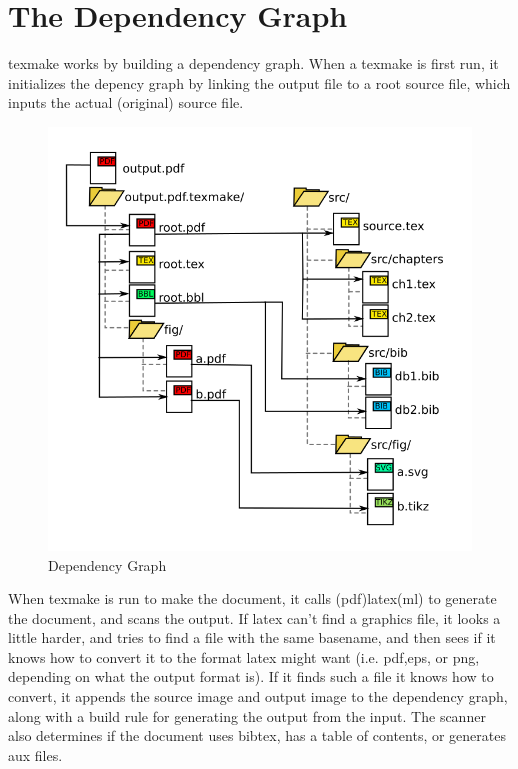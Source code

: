 \section{The Dependency Graph}

texmake works by building a dependency graph. 
%
When a texmake is first run, it initializes the depency graph by linking the output file to a root source file, which inputs the actual (original) source file.

\begin{figure}[H]
    \centering
    \includegraphics{fig/dependencies}
    \caption{Dependency Graph}
\end{figure}

When texmake is run to make the document, it calls (pdf)latex(ml) to generate the document, and scans the output.
%
If latex can't find a graphics file, it looks a little harder, and tries to find a file with the same basename, and then sees if it knows how to convert it to the format latex might want (i.e. pdf,eps, or png, depending on what the output format is). 
%
If it finds such a file it knows how to convert, it appends the source image and output image to the dependency graph, along with a build rule for generating the output from the input. 
%
The scanner also determines if the document uses bibtex, has a table of contents, or generates aux files.

